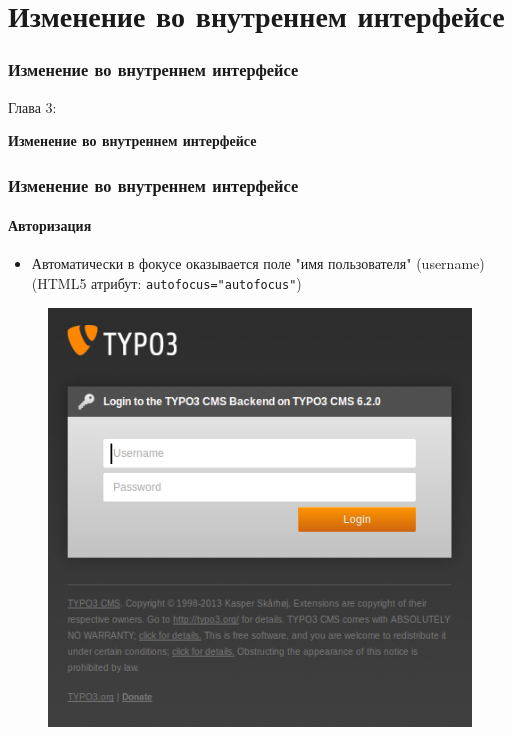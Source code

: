 %

\section{Изменение во внутреннем интерфейсе}
\begin{frame}[fragile]
	\frametitle{Изменение во внутреннем интерфейсе}

	\begin{center}\huge{Глава 3:}\end{center}
	\begin{center}\huge{\color{typo3darkgrey}\textbf{Изменение во внутреннем интерфейсе}}\end{center}

\end{frame}


\begin{frame}[fragile]
	\frametitle{Изменение во внутреннем интерфейсе}
	\framesubtitle{Авторизация}

 	\begin{itemize}
		\item Автоматически в фокусе оказывается поле "имя пользователя" (username)\newline
			(HTML5 атрибут: \texttt{autofocus="autofocus"})
	\end{itemize}

	\begin{figure}
		\includegraphics[width=0.4\linewidth]{Images/BackendChanges/BackendLogin.png}
	\end{figure}

\end{frame}

